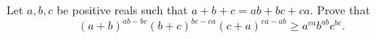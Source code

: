 Let $a,b,c$ be positive reals such that $a+b+c=ab+bc+ca$. Prove that \[ (a+b)^{ab-bc}(b+c)^{bc-ca}(c+a)^{ca-ab} \ge a^{ca}b^{ab}c^{bc}. \]